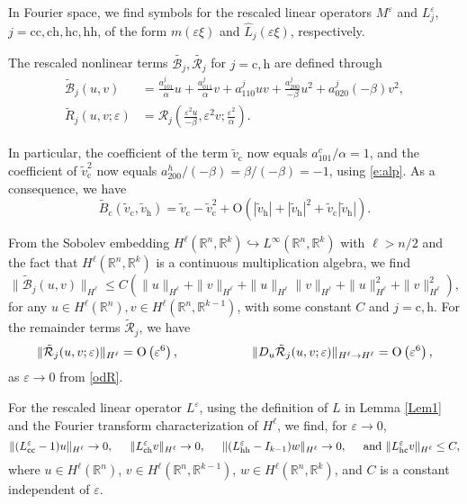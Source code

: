\documentclass[10pt]{article}
\newcommand{\R}{\mathbb{R}}
\newcommand{\rmO}{\mathrm{O}}
\newcommand{\eps}{\varepsilon}
\newcommand{\B}{\mathcal{B}}
\newcommand{\Rm}{\mathcal{R}}
\begin{document}
In Fourier space, we find symbols for the rescaled linear operators $M^\eps $ and $L^\eps_j$, $j = \mathrm{cc,ch,hc,hh}$, of the form  $m(\eps \xi)$ and $\widehat{L}_j(\eps \xi)$, respectively. 

The rescaled nonlinear terms $\tilde{\B_j}, \tilde{\Rm_j}$ for $j=\mathrm{c,h}$ are defined through 
\begin{align*}
\tilde{\B}_j(u,v)&=\frac{a^j_{101}}{\alpha}  u+\frac{a^j_{011}}{\alpha} v+a^j_{110}uv + \frac{a^j_{200}}{-\beta}u^2+a^j_{020}(-\beta)v^2 ,\\
\tilde{R}_j ( u,v;\eps)&=\Rm_j \left(\frac{\eps^2u}{-\beta},\eps^2v;\frac{\eps^2}{\alpha}\right).
\end{align*}

In particular, the coefficient of the term $\tilde{v}_\mathrm{c}$ now equals $ a_{101}^c/\alpha=1$, and the coefficient of $\tilde{v}_\mathrm{c}^2$ now equals $a_{200}^h/(-\beta)=\beta/(-\beta)=-1$, using \eqref{e:alp}. As a consequence, we have 
\[
\tilde{B}_\mathrm{c}(\tilde{v}_\mathrm{c},\tilde{v}_\mathrm{h}) = \tilde{v}_\mathrm{c}-\tilde{v}_\mathrm{c}^2 + \rmO\left(|\tilde{v}_\mathrm{h}|+|\tilde{v} _\mathrm{h}|^2+\tilde{v}_\mathrm{c}|\tilde{v} _\mathrm{h}|\right).
\] 



From the Sobolev embedding  $H^\ell(\R^n,\R^k)\hookrightarrow L^\infty(\R^n,\R^k) $ with $\ell>n/2$  and the fact that $H^\ell(\R^n,\R^k)$ is a continuous multiplication algebra, we find
\begin{equation}\label{Blest}
\|\tilde{\B}_j(u,v)\|_{H^\ell} \le C\left(\|u\|_{H^\ell}+\|v\|_{H^\ell}+\|u\|_{H^\ell}\|v\|_{H^\ell} +\|u\|_{H^\ell}^2+\|v\|^2_{H^\ell}\right),
\end{equation}
 for any $u\in H^\ell(\R^n), v\in H^\ell(\R^n,\R^{k-1})$, with some constant $C$ and  $j=\mathrm{c,h}$. For the remainder terms $\tilde{\Rm}_j$, we have 
\begin{equation} \label{Nlest}
 \|\tilde{\Rm}_j(u,v;\eps)\|_{H^\ell} = \rmO\left(\eps^6\right), \hspace{0.8in}\|D_u \tilde{\Rm}_j(u,v;\eps)\|_{H^\ell \to H^\ell} = \rmO\left(\eps^6\right),
\end{equation}
as $\eps \to 0$ from \eqref{odR}.

 For the rescaled linear operator $L^\eps$, using the definition of $L$ in Lemma \ref{Lem1} and the Fourier transform characterization of $H^\ell$, we find, for $\eps\to 0$, 
\begin{equation}\label{Liest}
\|(L^\eps_\mathrm{cc} - 1)u \|_{H^\ell} \to 0, \hspace{0.2in}\|L^\eps_\mathrm{ch}v \|_{H^\ell} \to 0, \hspace{0.2in}\|(L^\eps_\mathrm{hh}-I_{k-1})w \|_{H^\ell} \to 0, \hspace{0.2in} \text{and }\|L^\eps_\mathrm{hc}v \|_{H^\ell} \le C,
\end{equation}
where $u \in H^\ell(\R^n)$, $v\in H^\ell(\R^n,\R^{k-1})$, $w\in H^\ell(\R^n,\R^k)$, and $C$ is a constant independent of $\eps$. 
\end{document}
